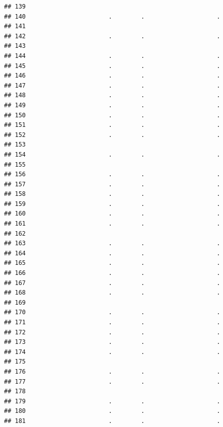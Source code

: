 \documentclass[
]{article}
\begin{document}
\begin{verbatim}
## 139                                                      
## 140                       .        .                    .
## 141                                                      
## 142                       .        .                    .
## 143                                                      
## 144                       .        .                    .
## 145                       .        .                    .
## 146                       .        .                    .
## 147                       .        .                    .
## 148                       .        .                    .
## 149                       .        .                    .
## 150                       .        .                    .
## 151                       .        .                    .
## 152                       .        .                    .
## 153                                                      
## 154                       .        .                    .
## 155                                                      
## 156                       .        .                    .
## 157                       .        .                    .
## 158                       .        .                    .
## 159                       .        .                    .
## 160                       .        .                    .
## 161                       .        .                    .
## 162                                                      
## 163                       .        .                    .
## 164                       .        .                    .
## 165                       .        .                    .
## 166                       .        .                    .
## 167                       .        .                    .
## 168                       .        .                    .
## 169                                                      
## 170                       .        .                    .
## 171                       .        .                    .
## 172                       .        .                    .
## 173                       .        .                    .
## 174                       .        .                    .
## 175                                                      
## 176                       .        .                    .
## 177                       .        .                    .
## 178                                                      
## 179                       .        .                    .
## 180                       .        .                    .
## 181                       .        .                    .

\end{verbatim}
\end{document}

